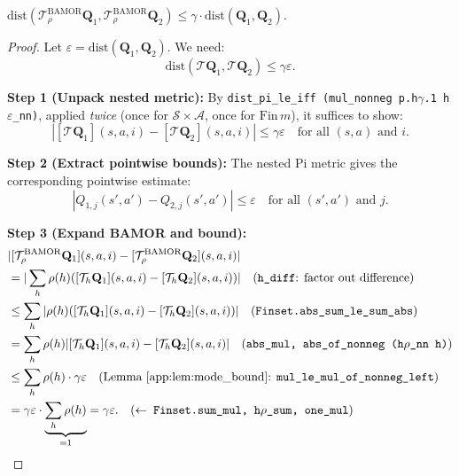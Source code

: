 \begin{theorem}
\label{thm:bamor_dist}
$\mathrm{dist}(\mathcal{T}^{\mathrm{BAMOR}}_\rho \mathbf{Q}_1, \mathcal{T}^{\mathrm{BAMOR}}_\rho \mathbf{Q}_2) \le \gamma \cdot \mathrm{dist}(\mathbf{Q}_1, \mathbf{Q}_2)$.
\end{theorem}
\begin{proof}
Let $\varepsilon = \mathrm{dist}(\mathbf{Q}_1, \mathbf{Q}_2)$.  We need:
\begin{equation}
    \mathrm{dist}(\mathcal{T}\mathbf{Q}_1, \mathcal{T}\mathbf{Q}_2) \le \gamma\varepsilon.
\end{equation}

\textbf{Step 1 (Unpack nested metric):} By \texttt{dist\_pi\_le\_iff (mul\_nonneg p.h$\gamma$.1 h$\varepsilon$\_nn)}, applied \emph{twice} (once for $\mathcal{S} \times \mathcal{A}$, once for $\mathrm{Fin}\,m$), it suffices to show:
\begin{equation}
    |[\mathcal{T}\mathbf{Q}_1](s,a,i) - [\mathcal{T}\mathbf{Q}_2](s,a,i)| \le \gamma\varepsilon \quad \text{for all } (s,a) \text{ and } i.
\end{equation}

\textbf{Step 2 (Extract pointwise bounds):}
The nested Pi metric gives the corresponding pointwise estimate:
\begin{equation}
    |Q_{1,j}(s',a') - Q_{2,j}(s',a')| \le \varepsilon \quad \text{for all } (s',a') \text{ and } j.
\end{equation}

\textbf{Step 3 (Expand BAMOR and bound):}
\begin{align}
    &|[\mathcal{T}^{\mathrm{BAMOR}}_\rho \mathbf{Q}_1](s,a,i) - [\mathcal{T}^{\mathrm{BAMOR}}_\rho \mathbf{Q}_2](s,a,i)| \\
    &= |\sum_h \rho(h)([\mathcal{T}_h \mathbf{Q}_1](s,a,i) - [\mathcal{T}_h \mathbf{Q}_2](s,a,i))| \quad \text{(\texttt{h\_diff}: factor out difference)}\\
    &\le \sum_h |\rho(h)([\mathcal{T}_h \mathbf{Q}_1](s,a,i) - [\mathcal{T}_h \mathbf{Q}_2](s,a,i))| \quad \text{(\texttt{Finset.abs\_sum\_le\_sum\_abs})} \\
    &= \sum_h \rho(h)|[\mathcal{T}_h \mathbf{Q}_1](s,a,i) - [\mathcal{T}_h \mathbf{Q}_2](s,a,i)| \quad \text{(\texttt{abs\_mul, abs\_of\_nonneg (h$\rho$\_nn h)})} \\
    &\le \sum_h \rho(h) \cdot \gamma\varepsilon \quad \text{(Lemma~\ref{app:lem:mode_bound}: \texttt{mul\_le\_mul\_of\_nonneg\_left})} \\
    &= \gamma\varepsilon \cdot \underbrace{\sum_h \rho(h)}_{=1} = \gamma\varepsilon. \quad \text{(\texttt{$\leftarrow$ Finset.sum\_mul, h$\rho$\_sum, one\_mul})}
\end{align}
\end{proof}

